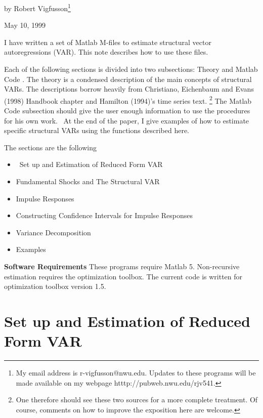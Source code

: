 \documentclass{article}
\begin{document}

{\Large by Robert Vigfusson\footnote{{\Large My email address is
r-vigfusson@nwu.edu. Updates to these programs will be made available on my
webpage htttp://pubweb.nwu.edu/rjv541. }}}

{\large May 10, 1999}

\bigskip

I have written a set of Matlab M-files to estimate structural vector
autoregressions (VAR). This note describes how to use these files.

Each of the following sections is divided into two subsections: Theory and
Matlab Code . The theory is a condensed description of the main concepts of
structural VARs. The descriptions borrow heavily from Christiano, Eichenbaum
and Evans (1998) Handbook chapter and Hamilton (1994)'s time series text.%
\footnote{%
One therefore should see these two sources for a more complete treatment. Of
course, comments on how to improve the exposition here are welcome.} The
Matlab Code subsection should give the user enough information to use the
procedures for his own work. \ At the end of the paper, I give examples of
how to estimate specific structural VARs using the functions described here.

The sections are the following

\begin{itemize}
\item  \qquad\ Set up and Estimation of Reduced Form VAR

\item  \qquad Fundamental Shocks and The Structural VAR

\item  \qquad Impulse Responses

\item  \qquad Constructing Confidence Intervals for Impulse Responses

\item  \qquad Variance Decomposition

\item  \qquad Examples
\end{itemize}

\textbf{Software Requirements} These programs require Matlab 5.
Non-recursive estimation requires the optimization toolbox. The current code
is written for optimization toolbox version 1.5. 

\section{Set up and Estimation of Reduced Form VAR}
\end{document}
